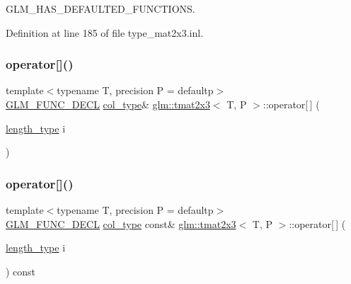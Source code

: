 G\+L\+M\+\_\+\+H\+A\+S\+\_\+\+D\+E\+F\+A\+U\+L\+T\+E\+D\+\_\+\+F\+U\+N\+C\+T\+I\+O\+NS. 



Definition at line 185 of file type\+\_\+mat2x3.\+inl.

\mbox{\label{structglm_1_1tmat2x3_a02f967c3523ed282c9dfa3b75e717bef}} 
\subsubsection{\texorpdfstring{operator[]()}{operator[]()}\hspace{0.1cm}{\footnotesize\ttfamily [1/2]}}
{\footnotesize\ttfamily template$<$typename T, precision P = defaultp$>$ \\
\mbox{\hyperlink{setup_8hpp_ab2d052de21a70539923e9bcbf6e83a51}{G\+L\+M\+\_\+\+F\+U\+N\+C\+\_\+\+D\+E\+CL}} \mbox{\hyperlink{structglm_1_1tmat2x3_a62523fc3d245c37e15d68c3b9729f366}{col\+\_\+type}}\& \mbox{\hyperlink{structglm_1_1tmat2x3}{glm\+::tmat2x3}}$<$ T, P $>$\+::operator\mbox{[}$\,$\mbox{]} (\begin{DoxyParamCaption}\item[{\mbox{\hyperlink{structglm_1_1tmat2x3_a25be85bf523cf3daa1c2b6b00ad45c82}{length\+\_\+type}}}]{i }\end{DoxyParamCaption})}

\mbox{\label{structglm_1_1tmat2x3_a560b4b9dbb25b1dcd476f0a90168fb6d}} 
\subsubsection{\texorpdfstring{operator[]()}{operator[]()}\hspace{0.1cm}{\footnotesize\ttfamily [2/2]}}
{\footnotesize\ttfamily template$<$typename T, precision P = defaultp$>$ \\
\mbox{\hyperlink{setup_8hpp_ab2d052de21a70539923e9bcbf6e83a51}{G\+L\+M\+\_\+\+F\+U\+N\+C\+\_\+\+D\+E\+CL}} \mbox{\hyperlink{structglm_1_1tmat2x3_a62523fc3d245c37e15d68c3b9729f366}{col\+\_\+type}} const\& \mbox{\hyperlink{structglm_1_1tmat2x3}{glm\+::tmat2x3}}$<$ T, P $>$\+::operator\mbox{[}$\,$\mbox{]} (\begin{DoxyParamCaption}\item[{\mbox{\hyperlink{structglm_1_1tmat2x3_a25be85bf523cf3daa1c2b6b00ad45c82}{length\+\_\+type}}}]{i }\end{DoxyParamCaption}) const}




